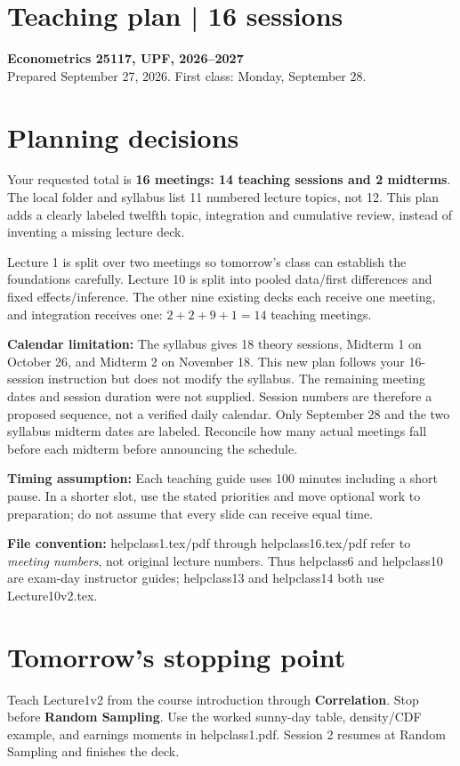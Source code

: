 \documentclass[11pt,a4paper]{article}
\newcommand{\heading}[1]{\section*{\color{accent}#1}}
\begin{document}
\heading{Teaching plan | 16 sessions}
\textbf{Econometrics 25117, UPF, 2026--2027}\\
Prepared September 27, 2026. First class: Monday, September 28.

\heading{Planning decisions}
Your requested total is \textbf{16 meetings: 14 teaching sessions and 2 midterms}. The local folder and syllabus list 11 numbered lecture topics, not 12. This plan adds a clearly labeled twelfth topic, integration and cumulative review, instead of inventing a missing lecture deck.

Lecture 1 is split over two meetings so tomorrow's class can establish the foundations carefully. Lecture 10 is split into pooled data/first differences and fixed effects/inference. The other nine existing decks each receive one meeting, and integration receives one: $2+2+9+1=14$ teaching meetings.

\textbf{Calendar limitation:} The syllabus gives 18 theory sessions, Midterm 1 on October 26, and Midterm 2 on November 18. This new plan follows your 16-session instruction but does not modify the syllabus. The remaining meeting dates and session duration were not supplied. Session numbers are therefore a proposed sequence, not a verified daily calendar. Only September 28 and the two syllabus midterm dates are labeled. Reconcile how many actual meetings fall before each midterm before announcing the schedule.

\textbf{Timing assumption:} Each teaching guide uses 100 minutes including a short pause. In a shorter slot, use the stated priorities and move optional work to preparation; do not assume that every slide can receive equal time.

\textbf{File convention:} helpclass1.tex/pdf through helpclass16.tex/pdf refer to \emph{meeting numbers}, not original lecture numbers. Thus helpclass6 and helpclass10 are exam-day instructor guides; helpclass13 and helpclass14 both use Lecture10v2.tex.

\heading{Tomorrow's stopping point}
Teach Lecture1v2 from the course introduction through \textbf{Correlation}. Stop before \textbf{Random Sampling}. Use the worked sunny-day table, density/CDF example, and earnings moments in helpclass1.pdf. Session 2 resumes at Random Sampling and finishes the deck.
\end{document}
